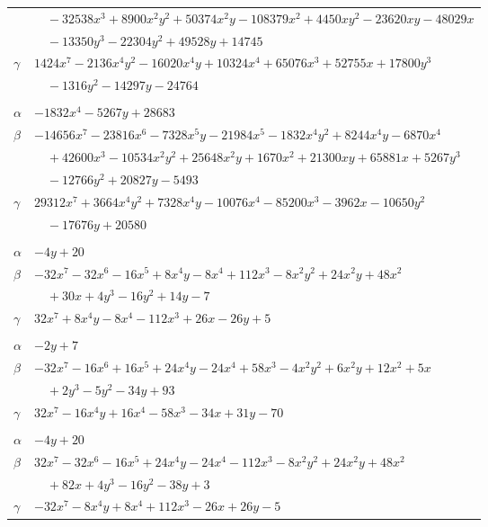 \documentclass[11pt]{article}
\begin{document}
\begin{longtable}{@{}ll@{}}
 & $\quad -32538x^{3}+8900x^{2}y^{2}+50374x^{2}y-108379x^{2}+4450xy^{2}-23620xy-48029x$\\
 & $\quad -13350y^{3}-22304y^{2}+49528y+14745$\\
$\gamma$ & $1424x^{7}-2136x^{4}y^{2}-16020x^{4}y+10324x^{4}+65076x^{3}+52755x+17800y^{3}$\\
 & $\quad -1316y^{2}-14297y-24764$\\
\addlinespace[3pt]
\multicolumn{2}{@{}l}{$\{i,j\}=\{37,52\}$, $k_{ij}=2^{2}\cdot 3^{4}\cdot 13^{2}$}\\
$\alpha$ & $-1832x^{4}-5267y+28683$\\
$\beta$ & $-14656x^{7}-23816x^{6}-7328x^{5}y-21984x^{5}-1832x^{4}y^{2}+8244x^{4}y-6870x^{4}$\\
 & $\quad +42600x^{3}-10534x^{2}y^{2}+25648x^{2}y+1670x^{2}+21300xy+65881x+5267y^{3}$\\
 & $\quad -12766y^{2}+20827y-5493$\\
$\gamma$ & $29312x^{7}+3664x^{4}y^{2}+7328x^{4}y-10076x^{4}-85200x^{3}-3962x-10650y^{2}$\\
 & $\quad -17676y+20580$\\
\addlinespace[3pt]
\multicolumn{2}{@{}l}{$\{i,j\}=\{37,58\}$, $k_{ij}=3^{3}$}\\
$\alpha$ & $-4y+20$\\
$\beta$ & $-32x^{7}-32x^{6}-16x^{5}+8x^{4}y-8x^{4}+112x^{3}-8x^{2}y^{2}+24x^{2}y+48x^{2}$\\
 & $\quad +30x+4y^{3}-16y^{2}+14y-7$\\
$\gamma$ & $32x^{7}+8x^{4}y-8x^{4}-112x^{3}+26x-26y+5$\\
\addlinespace[3pt]
\multicolumn{2}{@{}l}{$\{i,j\}=\{37,73\}$, $k_{ij}=2\cdot 3^{3}$}\\
$\alpha$ & $-2y+7$\\
$\beta$ & $-32x^{7}-16x^{6}+16x^{5}+24x^{4}y-24x^{4}+58x^{3}-4x^{2}y^{2}+6x^{2}y+12x^{2}+5x$\\
 & $\quad +2y^{3}-5y^{2}-34y+93$\\
$\gamma$ & $32x^{7}-16x^{4}y+16x^{4}-58x^{3}-34x+31y-70$\\
\addlinespace[3pt]
\multicolumn{2}{@{}l}{$\{i,j\}=\{37,79\}$, $k_{ij}=3^{3}$}\\
$\alpha$ & $-4y+20$\\
$\beta$ & $32x^{7}-32x^{6}-16x^{5}+24x^{4}y-24x^{4}-112x^{3}-8x^{2}y^{2}+24x^{2}y+48x^{2}$\\
 & $\quad +82x+4y^{3}-16y^{2}-38y+3$\\
$\gamma$ & $-32x^{7}-8x^{4}y+8x^{4}+112x^{3}-26x+26y-5$\\

\end{longtable}
\end{document}
